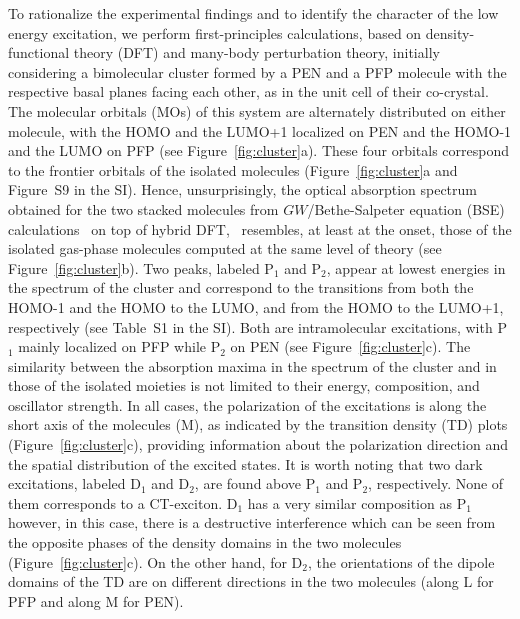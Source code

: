 \documentclass[journal=jpclcd,manuscript=letter]{achemso}
\begin{document}
To rationalize the experimental findings and to identify the character of the low energy excitation, we perform first-principles 
calculations, based on density-functional theory (DFT) and many-body perturbation theory, initially considering a bimolecular cluster formed by a PEN and a PFP molecule with the respective basal planes facing each other, as in the unit cell of their co-crystal.~\cite{davi+20cm}
The molecular orbitals (MOs) of this system are alternately distributed on either molecule, with the HOMO and the LUMO+1 localized on PEN and the HOMO-1 and the LUMO on PFP (see Figure~\ref{fig:cluster}a).
These four orbitals correspond to the frontier orbitals of the isolated molecules (Figure~\ref{fig:cluster}a and Figure~S9 in the SI).
Hence, unsurprisingly, the optical absorption spectrum obtained for the %
two stacked molecules from $GW$/Bethe-Salpeter equation (BSE) calculations~\cite{brun+16cpc} on top of hybrid DFT,~\cite{yana+04cpl} resembles, at least at the onset, those %
of the isolated gas-phase molecules computed at the same level of theory (see Figure~\ref{fig:cluster}b).
Two peaks, labeled P$_1$ and P$_2$, appear at lowest energies in the spectrum of the cluster and correspond to the transitions from both the HOMO-1 and the HOMO to the LUMO, and from the HOMO to the LUMO+1, respectively (see Table~S1 in the SI). 
Both are intramolecular excitations, with P$_1$ mainly localized on PFP while P$_2$ on PEN (see Figure~\ref{fig:cluster}c).
The similarity between the absorption maxima in the spectrum of the cluster and in those of the isolated moieties is not limited to their energy, composition, and oscillator strength.
In all cases, the polarization of the excitations is along the short axis of the molecules (M), as indicated by the transition density (TD) plots (Figure~\ref{fig:cluster}c), providing information about the polarization direction and the spatial distribution of the excited states.
It is worth noting that two dark excitations, labeled D$_1$ and D$_2$, are found above P$_1$ and P$_2$, respectively.
None of them corresponds to a CT-exciton.
D$_1$ has a very similar composition as P$_1$ however, in this case, there is a destructive interference which can be seen from the opposite phases of the density domains in the two molecules (Figure~\ref{fig:cluster}c).
On the other hand, for D$_2$, the orientations of the dipole domains of the TD are on different directions in the two molecules (along L for PFP and along M for PEN).
\end{document}
